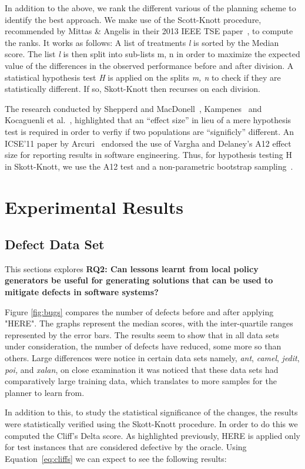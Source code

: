 \documentclass[conference]{IEEEtran}
\newcommand{\eq}[1]{Equation~\ref{eq:#1}}
\begin{document}
In addition to the above, we rank the different various of the planning scheme to identify the best approach. We make use of the Scott-Knott procedure, recommended by Mittas \& Angelis in their 2013 IEEE TSE paper~\cite{sk}, to compute the ranks. It works as follows: A list of treatments \textit{l} is sorted by the Median score. The list \textit{l} is then split into sub-lists m, n in order to maximize the expected value of the differences in the observed performance before and after division. A statistical hypothesis test \textit{H} is applied on the splits \textit{m, n} to check if they are statistically different. If so, Skott-Knott then recurses on each division. 

The research conducted by Shepperd and MacDonell~\cite{shepperd12a}, Kampenes~\cite{kampenes07} and Kocaguenli et al.~\cite{}, highlighted that an ``effect size'' in lieu of a mere hypothesis test is required in order to verfiy if two populations are ``significly'' different. An ICSE'11 paper by Arcuri~\cite{} endorsed the use of Vargha and Delaney's A12 effect size for reporting results in software engineering. Thus, for hypothesis testing H in Skott-Knott, we use the A12 test and a non-parametric bootstrap sampling~\cite{}.

\section{Experimental Results}

\subsection{Defect Data Set}
This sections explores \textbf{RQ2: Can lessons learnt from local policy generators be useful for generating solutions that can be used to mitigate defects in software systems?}

Figure \ref{fig:bugs} compares the number of defects before and after applying "HERE". The graphs represent the median scores, with the inter-quartile ranges represented by the error bars. The results seem to show that in all data sets under consideration, the number of defects have reduced, some more so than others. Large differences were notice in certain data sets namely, \textit{ant}, \textit{camel}, \textit{jedit}, \textit{poi,} and \textit{xalan}, on close examination it was noticed that these data sets had comparatively large training data, which translates to more samples for the planner to learn from.

In addition to this, to study the statistical significance of the changes, the results were statistically verified using the Skott-Knott procedure. In order to do this we computed the Cliff's Delta score. As highlighted previously, HERE is applied only for test instances that are considered defective by the oracle. Using \eq{cliffs} we can expect to see the following results:
\end{document}
